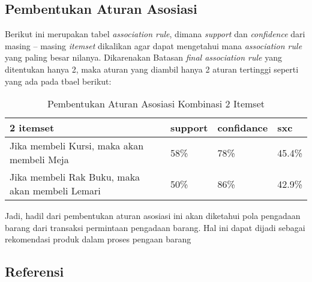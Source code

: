 \subsection{Pembentukan Aturan Asosiasi}
\par Berikut ini merupakan tabel \textit{association rule}, dimana \textit{support} dan \textit{confidence} dari masing – masing \textit{itemset} dikalikan agar dapat mengetahui mana \textit{association rule} yang paling besar nilanya. Dikarenakan Batasan \textit{final association rule} yang ditentukan hanya 2, maka aturan yang diambil hanya 2 aturan tertinggi seperti yang ada pada tbael berikut:
\begin{table}[!ht]
\caption{Pembentukan Aturan Asosiasi Kombinasi 2 Itemset}
\centering
\begin{tabular}{|l|l|l|l|}
\hline
2 itemset                                       & support & confidance & sxc\\ \hline
Jika membeli Kursi, maka akan membeli Meja      & 58\%    & 78\%       & 45.4\%               \\ \hline
Jika membeli Rak Buku, maka akan membeli Lemari & 50\%    & 86\%       & 42.9\%               \\ \hline
\end{tabular}
\end{table}

\par Jadi, hadil dari pembentukan aturan asosiasi ini akan diketahui pola pengadaan barang dari transaksi permintaan pengadaan barang. Hal ini dapat dijadi sebagai rekomendasi produk dalam proses pengaan barang

\subsection{Referensi}
